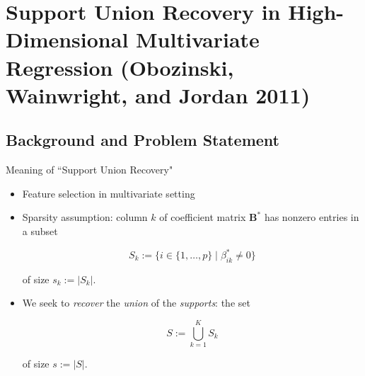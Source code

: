 \documentclass[notes]{beamer}       %
\begin{document}


\section{Support Union Recovery in High-Dimensional Multivariate Regression (Obozinski, Wainwright, and Jordan 2011)}

\subsection{Background and Problem Statement}

\begin{frame}{Meaning of ``Support Union Recovery"}{}
  \begin{itemize}
  \item {
    Feature selection in multivariate setting
  }
  \item {
   Sparsity assumption: column \(k\) of coefficient matrix \(\boldsymbol{B}^*\) has nonzero entries in a subset
   
   \begin{equation}
   S_k := \{i \in \{1, \ldots, p \} \mid \beta_{ik}^* \neq 0 \}
   \end{equation}
   
   of size \(s_k := | S_k|\).
  }


  \item{We seek to \textit{recover} the \textit{union} of the \textit{supports}: the set 
  
  \[
  S := \bigcup_{k=1}^K S_k
  \]
  }
  
  of size \(s:= |S|\).
  \end{itemize}
\end{frame}

\end{document}
